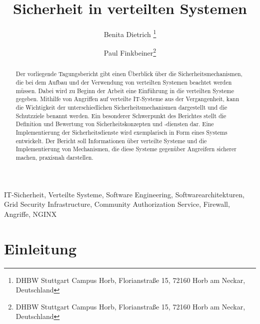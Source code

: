 \documentclass[utf8,biblatex]{lni}
\begin{document}
\title[Sicherheit in verteilten Systemen]{Sicherheit in verteilten Systemen}
\author[Benita Dietrich \and Paul Finkbeiner]
{Benita Dietrich \footnote{DHBW Stuttgart Campus Horb, Florianstraße 15, 72160 Horb am Neckar, Deutschland} \and
 Paul Finkbeiner\footnote{DHBW Stuttgart Campus Horb, Florianstraße 15, 72160 Horb am Neckar, Deutschland}}
\maketitle

\begin{abstract}
  Der vorliegende Tagungsbericht gibt einen Überblick über die Sicherheitsmechanismen, die bei dem Aufbau und der
  Verwendung von verteilten Systemen beachtet werden müssen. Dabei wird zu Beginn der Arbeit eine
  Einführung in die verteilten Systeme gegeben. Mithilfe von Angriffen auf verteilte IT-Systeme aus der
  Vergangenheit, kann die Wichtigkeit der unterschiedlichen Sicherheitsmechanismen dargestellt und die
  Schutzziele benannt werden. Ein besonderer Schwerpunkt des Berichtes stellt die Definition und Bewertung von
  Sicherheitskonzepten und -diensten dar. Eine Implementierung der Sicherheitsdienste wird exemplarisch in Form eines Systems
  entwickelt. Der Bericht soll Informationen über verteilte Systeme und die Implementierung von Mechanismen,
  die diese Systeme gegenüber Angreifern sicherer machen, praxisnah darstellen.
\end{abstract}

\begin{keywords}
IT-Sicherheit, Verteilte Systeme, Software Engineering, Softwarearchitekturen, Grid Security Infrastructure, Community Authorization Service, Firewall, Angriffe, NGINX
\end{keywords}

\section{Einleitung}\label{Einleitung}
\end{document}
